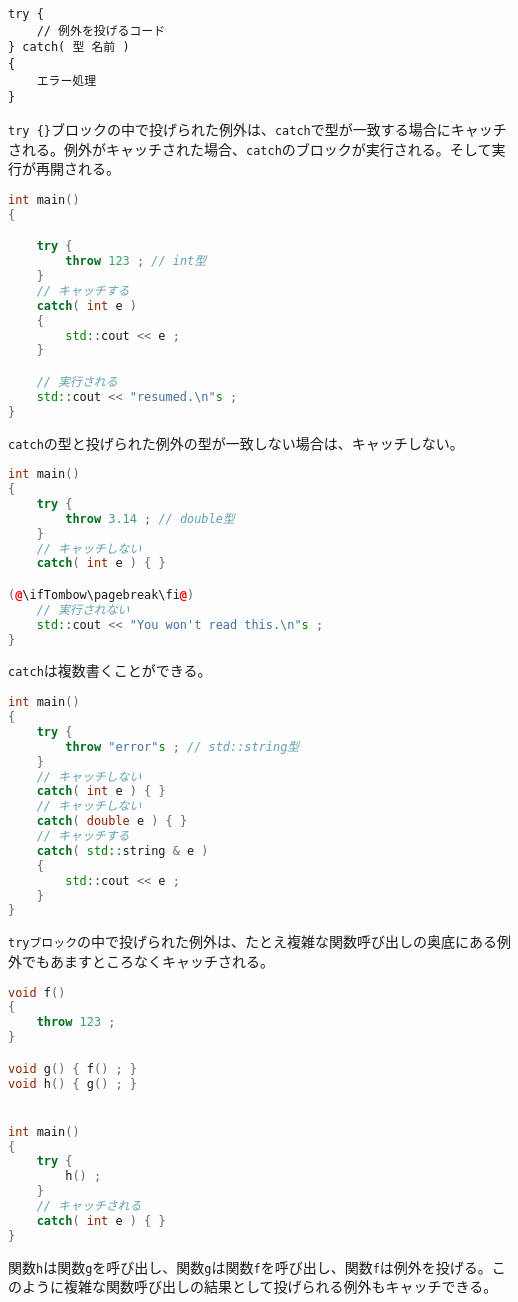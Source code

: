 \begin{lstlisting}[style=grammar]
try {
    // 例外を投げるコード
} catch( 型 名前 )
{
    エラー処理
}
\end{lstlisting}

\texttt{try \{\}}ブロックの中で投げられた例外は、\texttt{catch}で型が一致する場合にキャッチされる。例外がキャッチされた場合、\texttt{catch}のブロックが実行される。そして実行が再開される。

\begin{lstlisting}[language={C++}]
int main()
{

    try {
        throw 123 ; // int型
    }
    // キャッチする
    catch( int e )
    {
        std::cout << e ;
    }

    // 実行される
    std::cout << "resumed.\n"s ;
}
\end{lstlisting}

\texttt{catch}の型と投げられた例外の型が一致しない場合は、キャッチしない。

\begin{lstlisting}[language={C++}]
int main()
{
    try {
        throw 3.14 ; // double型
    }
    // キャッチしない
    catch( int e ) { }

(@\ifTombow\pagebreak\fi@)
    // 実行されない
    std::cout << "You won't read this.\n"s ;
}
\end{lstlisting}

\texttt{catch}は複数書くことができる。

\begin{lstlisting}[language={C++}]
int main()
{
    try {
        throw "error"s ; // std::string型
    }
    // キャッチしない
    catch( int e ) { }
    // キャッチしない
    catch( double e ) { }
    // キャッチする
    catch( std::string & e )
    {
        std::cout << e ;
    }
}
\end{lstlisting}

\texttt{tryブロック}の中で投げられた例外は、たとえ複雑な関数呼び出しの奥底にある例外でもあますところなくキャッチされる。

\begin{lstlisting}[language={C++}]
void f()
{
    throw 123 ;
}

void g() { f() ; } 
void h() { g() ; }


int main()
{
    try {
        h() ;
    }
    // キャッチされる
    catch( int e ) { }
}
\end{lstlisting}

関数\texttt{h}は関数\texttt{g}を呼び出し、関数\texttt{g}は関数\texttt{f}を呼び出し、関数\texttt{f}は例外を投げる。このように複雑な関数呼び出しの結果として投げられる例外もキャッチできる。

